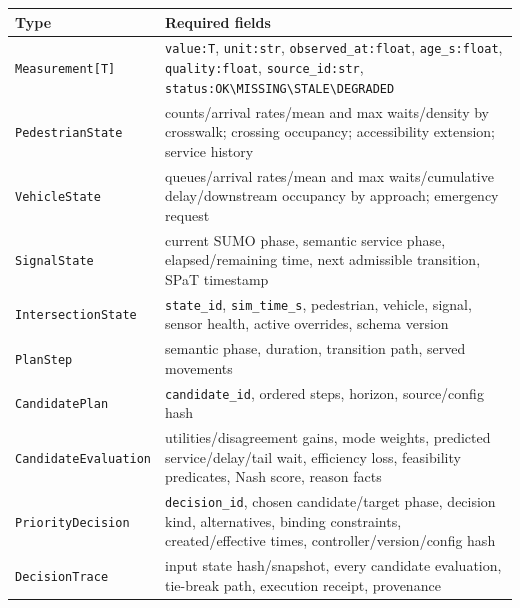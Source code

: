 \documentclass[
  english,
  11pt,
  a4paper,
]{article}
\newcounter{none} %
\begin{document}
{\def\LTcaptype{none} %
\begin{longtable}[]{@{}
  >{\raggedright\arraybackslash}p{}
  >{\raggedright\arraybackslash}p{}@{}}
\toprule\noalign{}
\begin{minipage}[b]{\linewidth}\raggedright
Type
\end{minipage} & \begin{minipage}[b]{\linewidth}\raggedright
Required fields
\end{minipage} \\
\midrule\noalign{}
\endhead
\bottomrule\noalign{}
\endlastfoot
\texttt{Measurement{[}T{]}} & \texttt{value:T}, \texttt{unit:str},
\texttt{observed\_at:float}, \texttt{age\_s:float},
\texttt{quality:float}, \texttt{source\_id:str},
\texttt{status:OK\textbackslash{}\textbar{}MISSING\textbackslash{}\textbar{}STALE\textbackslash{}\textbar{}DEGRADED} \\
\texttt{PedestrianState} & counts/arrival rates/mean and max
waits/density by crosswalk; crossing occupancy; accessibility extension;
service history \\
\texttt{VehicleState} & queues/arrival rates/mean and max
waits/cumulative delay/downstream occupancy by approach; emergency
request \\
\texttt{SignalState} & current SUMO phase, semantic service phase,
elapsed/remaining time, next admissible transition, SPaT timestamp \\
\texttt{IntersectionState} & \texttt{state\_id}, \texttt{sim\_time\_s},
pedestrian, vehicle, signal, sensor health, active overrides, schema
version \\
\texttt{PlanStep} & semantic phase, duration, transition path, served
movements \\
\texttt{CandidatePlan} & \texttt{candidate\_id}, ordered steps, horizon,
source/config hash \\
\texttt{CandidateEvaluation} & utilities/disagreement gains, mode
weights, predicted service/delay/tail wait, efficiency loss, feasibility
predicates, Nash score, reason facts \\
\texttt{PriorityDecision} & \texttt{decision\_id}, chosen
candidate/target phase, decision kind, alternatives, binding
constraints, created/effective times, controller/version/config hash \\
\texttt{DecisionTrace} & input state hash/snapshot, every candidate
evaluation, tie-break path, execution receipt, provenance \\

\end{longtable}}
\end{document}
